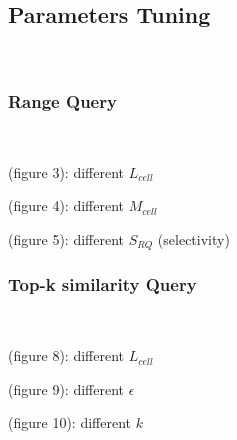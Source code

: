 \documentclass[conference]{IEEEtran}
\begin{document}
\subsection{Parameters Tuning}$  $



\subsubsection{Range Query}
$  $

(figure 3): different $L_{cell}$

(figure 4): different $M_{cell}$

(figure 5): different $S_{RQ}$ (selectivity)


\subsubsection{Top-k similarity Query}
$  $

(figure 8): different $L_{cell}$

(figure 9): different $\epsilon$

(figure 10): different $k$ 


%
%

\end{document}
